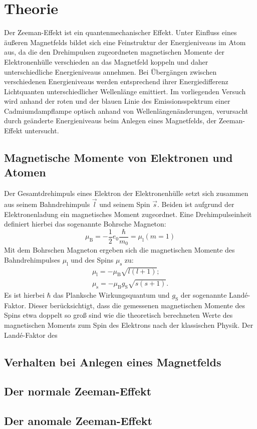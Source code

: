 \section{Theorie}
\label{sec:Theorie}
Der Zeeman-Effekt ist ein quantenmechanischer Effekt.
Unter Einfluss eines äußeren Magnetfelds bildet sich eine Feinstruktur der Energieniveaus im Atom aus, da die den Drehimpulsen zugeordneten magnetischen Momente der Elektronenhülle verschieden an das Magnetfeld koppeln und daher unterschiedliche Energieniveaus annehmen. Bei Übergängen zwischen verschiedenen Energieniveaus werden entsprechend ihrer Energiedifferenz Lichtquanten unterschiedlicher Wellenlänge emittiert.
Im vorliegenden Versuch wird anhand der roten und der blauen Linie des Emissionsspektrum einer Cadmiumdampflampe
optisch anhand von Wellenlängenänderungen, verursacht durch geänderte Energieniveaus beim Anlegen eines Magnetfelds, der Zeeman-Effekt untersucht.
\subsection{Magnetische Momente von Elektronen und Atomen}
Der Gesamtdrehimpuls eines Elektron der Elektronenhülle setzt sich zusammen aus seinem Bahndrehimpuls $\vec{l}$ und seinem Spin $\vec{s}$. Beiden ist aufgrund der Elektronenladung ein magnetisches Moment zugeordnet.
Eine Drehimpulseinheit definiert hierbei das sogenannte Bohrsche Magneton:
\begin{equation}
  \mu_{\mathrm{B}}=-\frac{1}{2}e_0\frac{\hbar}{m_0}=\mu_{\mathrm{l}}(m=1)
\end{equation}
Mit dem Bohrschen Magneton ergeben sich die magnetischen Momente des Bahndrehimpulses $\mu_{\mathrm{l}}$ und des Spins $\mu_{\mathrm{s}}$ zu:
\begin{gather}
  \mu_{\mathrm{l}}=-\mu_{\mathrm{B}}\sqrt{l\left(l+1\right)}\mathrm{;}\\
  \mu_{\mathrm{s}}=-\mu_{\mathrm{B}}g_{\mathrm{S}}\sqrt{s\left(s+1\right)}\mathrm{.}
\end{gather}
Es ist hierbei $\hbar$ das Planksche Wirkungsquantum und $g_{\mathrm{S}}$ der sogenannte Landé-Faktor. Dieser berücksichtigt, dass die gemessenen magnetischen Momente des Spins
etwa doppelt so groß sind wie die theoretisch berechneten Werte des magnetischen Moments zum Spin des Elektrons nach der klassischen Physik. Der Landé-Faktor des 
\subsection{Verhalten bei Anlegen eines Magnetfelds}
\subsection{Der normale Zeeman-Effekt}
\subsection{Der anomale Zeeman-Effekt}

